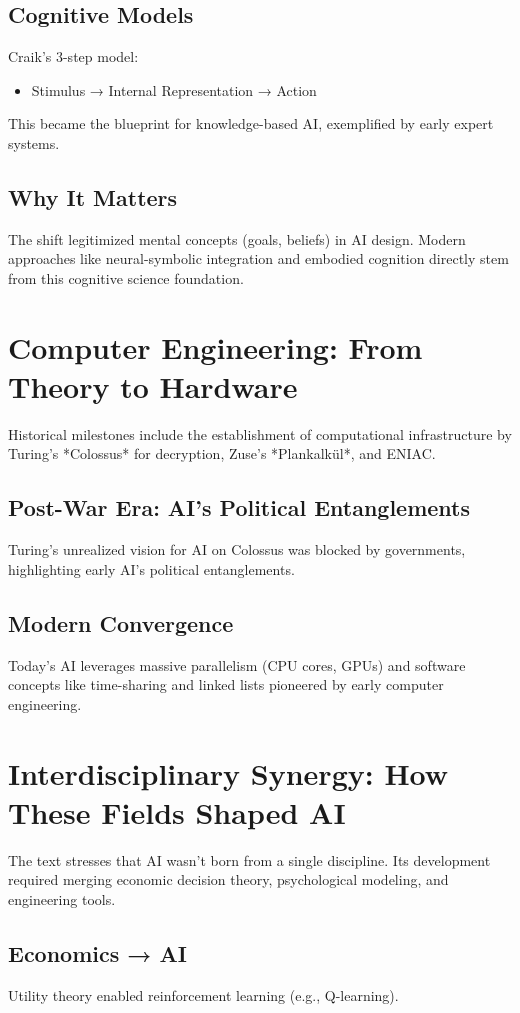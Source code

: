 \documentclass{article}
\begin{document}
\subsection{Cognitive Models}
Craik’s 3-step model: 
\begin{itemize}
    \item Stimulus → Internal Representation → Action
\end{itemize}
This became the blueprint for knowledge-based AI, exemplified by early expert systems.

\subsection{Why It Matters}
The shift legitimized mental concepts (goals, beliefs) in AI design. Modern approaches like neural-symbolic integration and embodied cognition directly stem from this cognitive science foundation.

\section{Computer Engineering: From Theory to Hardware}
Historical milestones include the establishment of computational infrastructure by Turing’s *Colossus* for decryption, Zuse’s *Plankalkül*, and ENIAC.

\subsection{Post-War Era: AI's Political Entanglements}
Turing's unrealized vision for AI on Colossus was blocked by governments, highlighting early AI’s political entanglements.

\subsection{Modern Convergence}
Today’s AI leverages massive parallelism (CPU cores, GPUs) and software concepts like time-sharing and linked lists pioneered by early computer engineering.

\section{Interdisciplinary Synergy: How These Fields Shaped AI}
The text stresses that AI wasn’t born from a single discipline. Its development required merging economic decision theory, psychological modeling, and engineering tools.

\subsection{Economics → AI}
Utility theory enabled reinforcement learning (e.g., Q-learning).
\end{document}
